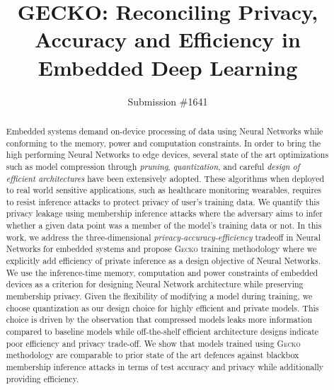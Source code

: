 \documentclass[sigconf]{acmart}
\newcommand{\method}{{\scshape Gecko}}
\begin{document}
\title{G{\LARGE ECKO}: Reconciling Privacy, Accuracy and Efficiency in Embedded Deep Learning}

\author{Submission \#1641}


\begin{abstract}
Embedded systems demand on-device processing of data using Neural Networks while conforming to the memory, power and computation constraints.
In order to bring the high performing Neural Networks to edge devices, several state of the art optimizations such as model compression through \textit{pruning}, \textit{quantization}, and careful \textit{design of efficient architectures} have been extensively adopted.
These algorithms when deployed to real world sensitive applications, such as healthcare monitoring wearables, requires to resist inference attacks to protect privacy of user's training data.
We quantify this privacy leakage using membership inference attacks where the adversary aims to infer whether a given data point was a member of the model's training data or not.
In this work, we address the three-dimensional \textit{privacy-accuracy-efficiency} tradeoff in Neural Networks for embedded systems and propose \method\hspace{0.02in} training methodology where we explicitly add efficiency of private inference as a design objective of Neural Networks.
We use the inference-time memory, computation and power constraints of embedded devices as a criterion for designing Neural Network architecture while preserving membership privacy.
Given the flexibility of modifying a model during training, we choose quantization as our design choice for highly efficient and private models.
This choice is driven by the observation that compressed models leaks more information compared to baseline models while off-the-shelf efficient architecture designs indicate poor efficiency and privacy trade-off.
We show that models trained using \method\hspace{0.02in} methodology are comparable to prior state of the art defences against blackbox membership inference attacks in terms of test accuracy and privacy while additionally providing efficiency.
\end{abstract}

\maketitle











%
%



\end{document}

